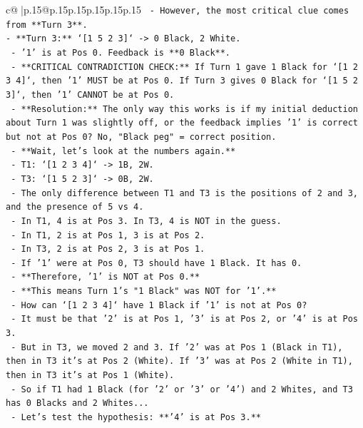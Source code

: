 \documentclass{article}
\begin{document}
{\begin{supertabular}{c@{$\;$}|p{.15\linewidth}@{}p{.15\linewidth}p{.15\linewidth}p{.15\linewidth}p{.15\linewidth}p{.15\linewidth}}
{{{\texttt{  {-} However, the most critical clue comes from **Turn 3**.} \\
\texttt{{-} **Turn 3:** `{[}1 5 2 3{]}` {-}> 0 Black, 2 White.} \\
\texttt{  {-} '1' is at Pos 0. Feedback is **0 Black**.} \\
\texttt{  {-} **CRITICAL CONTRADICTION CHECK:** If Turn 1 gave 1 Black for `{[}1 2 3 4{]}`, then '1' MUST be at Pos 0. If Turn 3 gives 0 Black for `{[}1 5 2 3{]}`, then '1' CANNOT be at Pos 0.} \\
\texttt{  {-} **Resolution:** The only way this works is if my initial deduction about Turn 1 was slightly off, or the feedback implies '1' is correct but not at Pos 0? No, "Black peg" = correct position.} \\
\texttt{  {-} **Wait, let's look at the numbers again.**} \\
\texttt{    {-} T1: `{[}1 2 3 4{]}` {-}> 1B, 2W.} \\
\texttt{    {-} T3: `{[}1 5 2 3{]}` {-}> 0B, 2W.} \\
\texttt{    {-} The only difference between T1 and T3 is the positions of 2 and 3, and the presence of 5 vs 4.} \\
\texttt{    {-} In T1, 4 is at Pos 3. In T3, 4 is NOT in the guess.} \\
\texttt{    {-} In T1, 2 is at Pos 1, 3 is at Pos 2.} \\
\texttt{    {-} In T3, 2 is at Pos 2, 3 is at Pos 1.} \\
\texttt{    {-} If '1' were at Pos 0, T3 should have 1 Black. It has 0.} \\
\texttt{    {-} **Therefore, '1' is NOT at Pos 0.**} \\
\texttt{    {-} **This means Turn 1's "1 Black" was NOT for '1'.**} \\
\texttt{    {-} How can `{[}1 2 3 4{]}` have 1 Black if '1' is not at Pos 0?} \\
\texttt{      {-} It must be that '2' is at Pos 1, '3' is at Pos 2, or '4' is at Pos 3.} \\
\texttt{      {-} But in T3, we moved 2 and 3. If '2' was at Pos 1 (Black in T1), then in T3 it's at Pos 2 (White). If '3' was at Pos 2 (White in T1), then in T3 it's at Pos 1 (White).} \\
\texttt{      {-} So if T1 had 1 Black (for '2' or '3' or '4') and 2 Whites, and T3 has 0 Blacks and 2 Whites...} \\
\texttt{      {-} Let's test the hypothesis: **'4' is at Pos 3.**} \\
}}}
\end{supertabular}}
\end{document}
